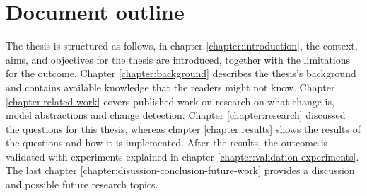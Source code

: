 \section{Document outline}
The thesis is structured as follows, in chapter \ref{chapter:introduction}, the context, aims, and objectives for the thesis are introduced, together with the limitations for the outcome. Chapter \ref{chapter:background} describes the thesis's background and contains available knowledge that the readers might not know. Chapter \ref{chapter:related-work} covers published work on research on what change is, model abstractions and change detection. Chapter \ref{chapter:research} discussed the questions for this thesis, whereas chapter \ref{chapter:results} shows the results of the questions and how it is implemented. After the results, the outcome is validated with experiments explained in chapter \ref{chapter:validation-experiments}. The last chapter \ref{chapter:disussion-conclusion-future-work} provides a discussion and possible future research topics.